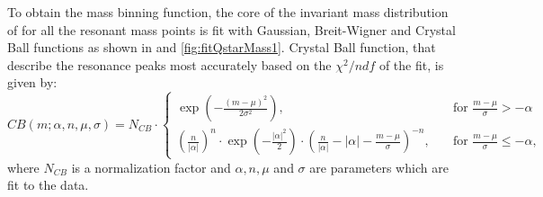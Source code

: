 To obtain the mass binning function, the core of the invariant mass distribution of \qstar for all the resonant mass points is fit with Gaussian,
Breit-Wigner and Crystal Ball functions as shown in \fig{\ref{fig:fitQstarMass}} and \ref{fig:fitQstarMass1}. 
Crystal Ball function, that describe the resonance peaks most accurately based on the $\chi^{2}/ndf$ of the fit, is given by:
\begin{equation}
CB(m; \alpha, n, \mu, \sigma) = N_{CB} \cdot \left\lbrace \begin{array}{lr}
\exp\left( -\frac{(m-\mu)^2}{2\sigma^2}\right) , & \quad \text{for } \frac{m-\mu}{\sigma} > -\alpha \\
\left( \frac{n}{|\alpha |}\right)^n \cdot \exp \left(-\frac{|\alpha|^2}{2}\right) \cdot \left(\frac{n}{|\alpha|}-|\alpha| - \frac{m-\mu}{\sigma}\right)^{-n} , & \quad \text{for } \frac{m-\mu}{\sigma} \leq -\alpha ,
\end{array}
\right.
\label{eq:crystalball}
\end{equation}
where $N_{CB}$ is a normalization factor and $\alpha, n, \mu$ and $\sigma$ are parameters which are fit to the data.
